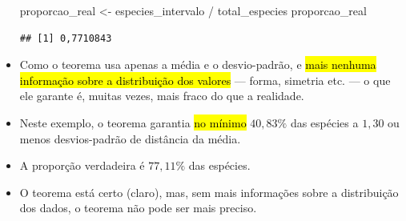 \documentclass[
  11pt]{report}
\newenvironment{Shaded}{\begin{snugshade}}{\end{snugshade}}
\newcommand{\NormalTok}[1]{#1}
\newcommand{\OtherTok}[1]{\textcolor[rgb]{0.56,0.35,0.01}{#1}}
\newcommand{\SpecialCharTok}[1]{\textcolor[rgb]{0.00,0.00,0.00}{#1}}
\renewenvironment{Shaded}{
    \begin{mdframed}[%
      roundcorner=2pt,%
      innerleftmargin=5pt,%
      innerrightmargin=5pt,%
      topline=true,%
      leftline=true,%
      rightline=true,%
      bottomline=true,%
      linewidth=0.5pt,%
      linecolor=black!20,%
      backgroundcolor=black!2,%
      skipabove=2ex,%
      skipbelow=2.5ex%
    ]%
  }
  {
    \end{mdframed}
  }
\begin{document}
\begin{itemize}
\begin{Shaded}
\begin{Highlighting}[]
\NormalTok{proporcao\_real }\OtherTok{\textless{}{-}}\NormalTok{ especies\_intervalo }\SpecialCharTok{/}\NormalTok{ total\_especies}
\NormalTok{proporcao\_real}
\end{Highlighting}
\end{Shaded}

\begin{verbatim}
## [1] 0,7710843
\end{verbatim}
\item
  Como o teorema usa apenas a média e o desvio-padrão, e {\hl{mais nenhuma informação sobre a distribuição dos valores}} --- forma, simetria etc. --- o que ele garante é, muitas vezes, mais fraco do que a realidade.
\item
  Neste exemplo, o teorema garantia {\hl{no mínimo}} $40{,}83\%$ das espécies a $1{,}30$ ou menos desvios-padrão de distância da média.
\item
  A proporção verdadeira é $77{,}11\%$ das espécies.
\item
  O teorema está certo (claro), mas, sem mais informações sobre a distribuição dos dados, o teorema não pode ser mais preciso.
\end{itemize}
\end{document}
